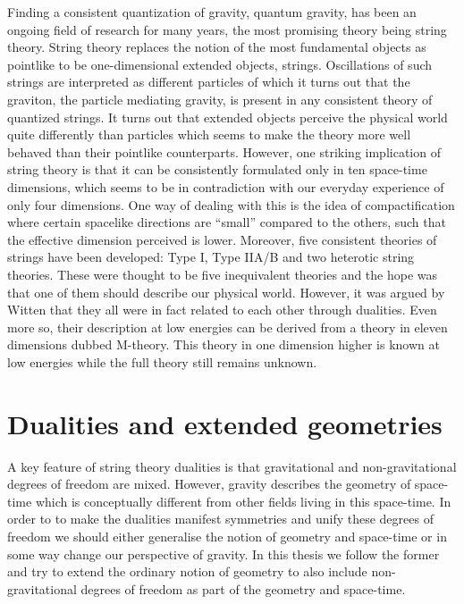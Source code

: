 Finding a consistent quantization of gravity, quantum gravity, has been an ongoing field of research for many years, the most promising theory being string theory. String theory replaces the notion of the most fundamental objects as pointlike to be one-dimensional extended objects, strings. Oscillations of such strings are interpreted as different particles of which it turns out that the graviton, the particle mediating gravity, is present in any consistent theory of quantized strings. It turns out that extended objects perceive the physical world quite differently than particles which seems to make the theory more well behaved than their pointlike counterparts. However, one striking implication of string theory is that it can be consistently formulated only in ten space-time dimensions, which seems to be in contradiction with our everyday experience of only four dimensions. One way of dealing with this is the idea of compactification where certain spacelike directions are ``small'' compared to the others, such that the effective dimension perceived is lower. Moreover, five consistent theories of strings have been developed: Type I, Type IIA/B and two heterotic string theories. These were thought to be five inequivalent theories and the hope was that one of them should describe our physical world. However, it was argued by Witten \cite{WittenDualities1995} that they all were in fact related to each other through dualities. Even more so, their description at low energies can be derived from a theory in eleven dimensions dubbed M-theory. This theory in one dimension higher is known at low energies while the full theory still remains unknown.

\section{Dualities and extended geometries}
A key feature of string theory dualities is that gravitational and non-gravitational degrees of freedom are mixed. However, gravity describes the geometry of space-time which is conceptually different from other fields living in this space-time. In order to to make the dualities manifest symmetries and unify these degrees of freedom we should either generalise the notion of geometry and space-time or in some way change our perspective of gravity. In this thesis we follow the former and try to extend the ordinary notion of geometry to also include non-gravitational degrees of freedom as part of the geometry and space-time. 

